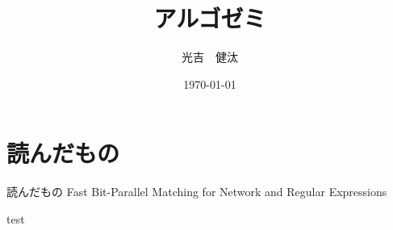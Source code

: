 \documentclass[dvipdfmx,12pt,notheorems]{beamer} %
\title[略タイトル]{アルゴゼミ}
\author[Mitsuyoshi]{光吉　健汰\inst{1}}
\institute[IKN]{\inst{1}北海道大学工学部 情報エレクトロニクス学科 情報理工学コース 4年\\
情報知識ネットワーク研究室}
\date{\today}%
\begin{document}
\begin{frame}
	\frametitle{}
	\titlepage
\end{frame}


\section{読んだもの}
\begin{frame}{読んだもの}
	Fast Bit-Parallel Matching for Network and Regular Expressions
\end{frame}
	


{test}
\end{document}
